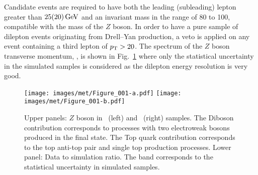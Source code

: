 Candidate events are required to have both the leading (subleading) lepton \pt greater than $25(20)\,\text{Ge\hspace{-.08em}V}$ and an invariant mass in the range of 80 to 100\GeV, compatible with the mass of the 
$Z$ boson.
In order to have a pure sample of dilepton events originating from Drell--Yan production, a veto is applied on any event containing a third lepton of $p_{\mathrm{T}} > 20$\GeV. 
The spectrum of the $Z$ boson transverse momentum, \qt, is shown in Fig.~\ref{fig:zbosonpt} where only the statistical uncertainty in the simulated samples is considered as the dilepton energy resolution is very good.
\begin{figure}[!htb]
  \centering
  \texttt{[image: images/met/Figure\_001-a.pdf]}
  \texttt{[image: images/met/Figure\_001-b.pdf]}
  \caption{Upper panels: $Z$ boson \qt in \Zmm\ (left) and \Zee\ (right) samples. The Diboson contribution corresponds to processes with two electroweak bosons produced in the final state. The Top quark contribution corresponds to the top anti-top pair and single top production processes. Lower panel: Data to simulation ratio. The band corresponds to the statistical uncertainty in simulated samples. }
  \label{fig:zbosonpt}
\end{figure}
